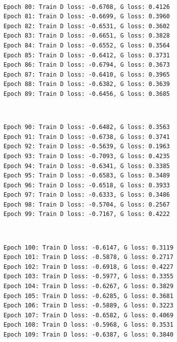 \documentclass[11pt]{article}
\begin{document}
    \begin{center}
    \end{center}
    { \hspace*{\fill} \\}
    
    \begin{Verbatim}[commandchars=\\\{\}]
Epoch 80: Train D loss: -0.6708, G loss: 0.4126
Epoch 81: Train D loss: -0.6699, G loss: 0.3960
Epoch 82: Train D loss: -0.6531, G loss: 0.3602
Epoch 83: Train D loss: -0.6651, G loss: 0.3828
Epoch 84: Train D loss: -0.6552, G loss: 0.3564
Epoch 85: Train D loss: -0.6412, G loss: 0.3731
Epoch 86: Train D loss: -0.6794, G loss: 0.3673
Epoch 87: Train D loss: -0.6410, G loss: 0.3965
Epoch 88: Train D loss: -0.6382, G loss: 0.3639
Epoch 89: Train D loss: -0.6456, G loss: 0.3685

    \end{Verbatim}

    \begin{center}
    \end{center}
    { \hspace*{\fill} \\}
    
    \begin{Verbatim}[commandchars=\\\{\}]
Epoch 90: Train D loss: -0.6482, G loss: 0.3563
Epoch 91: Train D loss: -0.6738, G loss: 0.3741
Epoch 92: Train D loss: -0.5639, G loss: 0.1963
Epoch 93: Train D loss: -0.7093, G loss: 0.4235
Epoch 94: Train D loss: -0.6341, G loss: 0.3385
Epoch 95: Train D loss: -0.6583, G loss: 0.3489
Epoch 96: Train D loss: -0.6518, G loss: 0.3933
Epoch 97: Train D loss: -0.6333, G loss: 0.3486
Epoch 98: Train D loss: -0.5704, G loss: 0.2567
Epoch 99: Train D loss: -0.7167, G loss: 0.4222

    \end{Verbatim}

    \begin{center}
    \end{center}
    { \hspace*{\fill} \\}
    
    \begin{Verbatim}[commandchars=\\\{\}]
Epoch 100: Train D loss: -0.6147, G loss: 0.3119
Epoch 101: Train D loss: -0.5878, G loss: 0.2717
Epoch 102: Train D loss: -0.6918, G loss: 0.4227
Epoch 103: Train D loss: -0.5977, G loss: 0.3355
Epoch 104: Train D loss: -0.6267, G loss: 0.3829
Epoch 105: Train D loss: -0.6285, G loss: 0.3681
Epoch 106: Train D loss: -0.5889, G loss: 0.3223
Epoch 107: Train D loss: -0.6582, G loss: 0.4069
Epoch 108: Train D loss: -0.5968, G loss: 0.3531
Epoch 109: Train D loss: -0.6387, G loss: 0.3840

    \end{Verbatim}
\end{document}
